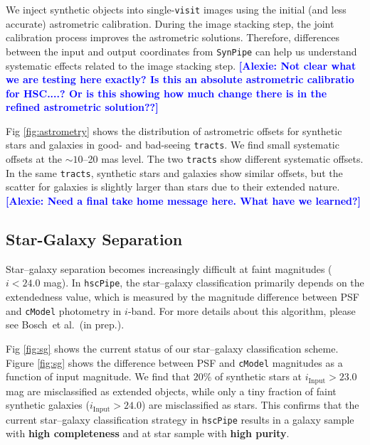 \documentclass[useamsfonts]{pasj01}
\def\etal{{\ et al.~}}
\newcommand{\alexie}[1]{\textcolor{blue}{\textbf{[Alexie: #1]}}}
\def\hscpipe{\texttt{hscPipe}}
\def\synpipe{\texttt{SynPipe}}
\def\cmodel{\texttt{cModel}}
\def\visit{\texttt{visit}}
\def\tracts{\texttt{tracts}}
\begin{document}
    We inject synthetic objects into single-\visit{} images using the initial (and less accurate) astrometric calibration.
    During the image stacking step, the joint calibration process improves the
    astrometric solutions.
    Therefore, differences between the input and output coordinates from \synpipe{}
    can help us understand systematic effects related to the image stacking step. \alexie{Not clear what we are testing here exactly? Is this an absolute astrometric calibratio for HSC....? Or is this showing how much change there is in the refined astrometric solution??}

    Fig \ref{fig:astrometry} shows the distribution of astrometric offsets for synthetic stars and galaxies in good- and bad-seeing \tracts{}.
    We find small systematic offsets at the ${\sim}10$--20 mas level.
    The two \tracts{} show different systematic offsets.
    In the same \tracts{}, synthetic stars and galaxies show similar offsets, but the scatter for galaxies is slightly larger than stars due to their extended nature. \alexie{Need a final take home message here. What have we learned?}

\subsection{Star-Galaxy Separation}
    \label{ssec:sg}

    Star--galaxy separation becomes increasingly difficult at faint magnitudes ($i<24.0$ mag).
    In \hscpipe{}, the star--galaxy classification primarily depends on the 
    extendedness value, which is measured by the magnitude difference between PSF and 
    \cmodel{} photometry in $i$-band.
    For more details about this algorithm, please see Bosch\etal (in prep.).

    Fig \ref{fig:sg} shows the current status of our star--galaxy classification scheme.  Figure  \ref{fig:sg} shows the difference between PSF and \cmodel{}
    magnitudes as a function of  input magnitude. We find that $20$\% of synthetic stars at $i_{\mathrm{Input}}>23.0$ mag are misclassified as extended objects, while only a tiny fraction of faint synthetic galaxies ($i_{\mathrm{Input}}>24.0$) are
    misclassified as stars. This confirms that the current star--galaxy classification strategy in \hscpipe{}
    results in a galaxy sample with \textbf{high completeness} and at star sample
    with \textbf{high purity}.
\end{document}
